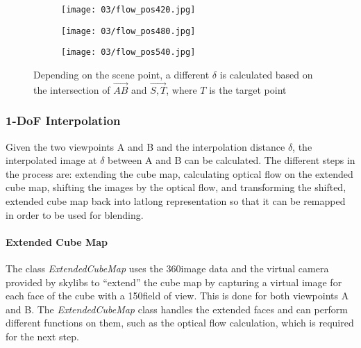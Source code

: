 \begin{figure}
\centering
    \hfill
    \begin{subfigure}[t]{0.33\textwidth}            
            \centering
            \texttt{[image: 03/flow\_pos420.jpg]}
            \caption{}
    \end{subfigure}%
    \hfill
    \begin{subfigure}[t]{0.33\textwidth}
            \centering
            \texttt{[image: 03/flow\_pos480.jpg]}
            \caption{}
    \end{subfigure}
    \hfill
    \begin{subfigure}[t]{0.33\textwidth}
            \centering
            \texttt{[image: 03/flow\_pos540.jpg]}
            \caption{}
    \end{subfigure}
    \hfill
    \caption[Different examples of $\delta$]{Depending on the scene point, a different $\delta$ is calculated based on the intersection of $\overrightarrow{AB}$ and $\overrightarrow{S,T}$, where $T$ is the target point} \label{fig:flow_pos}
\end{figure}

\subsubsection{1-DoF Interpolation}
Given the two viewpoints A and B and the interpolation distance $\delta$, the interpolated image at $\delta$ between A and B can be calculated. The different steps in the process are: extending the cube map, calculating optical flow on the extended cube map, shifting the images by the optical flow, and transforming the shifted, extended cube map back into latlong representation so that it can be remapped in order to be used for blending.

\paragraph{Extended Cube Map}
The class \emph{ExtendedCubeMap} uses the 360\degree image data and the virtual camera provided by skylibs \cite{skylibs} to ``extend'' the cube map by capturing a virtual image for each face of the cube with a 150\degree field of view. This is done for both viewpoints A and B. The \emph{ExtendedCubeMap} class handles the extended faces and can perform different functions on them, such as the optical flow calculation, which is required for the next step.

